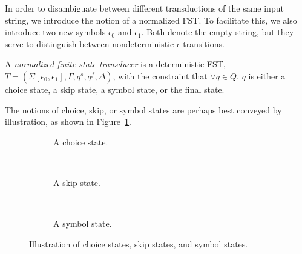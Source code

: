 In order to disambiguate between different transductions of the same input
string, we introduce the notion of a normalized FST. To facilitate this, we
also introduce two new symbols $\epsilon_0$ and $\epsilon_1$. Both denote the
empty string, but they serve to distinguish between nondeterministic
$\epsilon$-transitions.

\begin{definition}[NFST]
  A \emph{normalized finite state transducer} is a deterministic FST,
  $T = (\Sigma[\epsilon_0,\epsilon_1], \Gamma, q^s, q^f, \Delta)$, with the
  constraint that $\forall q \in Q$, $q$ is either a choice state, a skip
  state, a symbol state, or the final state.
\end{definition}

The notions of choice, skip, or symbol states are perhaps best conveyed by
illustration, as shown in Figure~\ref{fig:nfst-states}.

\begin{figure}[!ht]
  \centering
  \begin{subfigure}[b]{0.3\textwidth}
    \centering
    \caption{A choice state.}
  \end{subfigure}
  ~
  \begin{subfigure}[b]{0.3\textwidth}
    \centering
    \caption{A skip state.}
  \end{subfigure}
  ~
  \begin{subfigure}[b]{0.3\textwidth}
    \centering
    \caption{A symbol state.}
  \end{subfigure}
  \caption{Illustration of choice states, skip states, and symbol states.}
  \label{fig:nfst-states}
\end{figure}

